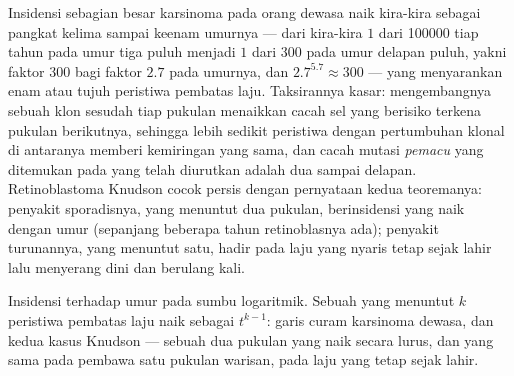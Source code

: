 \begin{example}\label{ex:b3:cancer-biology:exponent}
Insidensi sebagian besar karsinoma pada orang dewasa naik kira-kira sebagai
pangkat kelima sampai keenam umurnya --- dari kira-kira $1$ dari \num{100000}
tiap tahun pada umur tiga puluh menjadi $1$ dari $300$ pada umur delapan
puluh, yakni faktor $300$ bagi faktor $2.7$ pada umurnya, dan
$2.7^{5.7} \approx 300$ --- yang menyarankan enam atau tujuh peristiwa
pembatas laju. Taksirannya kasar: mengembangnya sebuah klon sesudah tiap
pukulan menaikkan cacah sel yang berisiko terkena pukulan berikutnya,
sehingga lebih sedikit peristiwa dengan pertumbuhan klonal di antaranya memberi
kemiringan yang sama, dan cacah mutasi \emph{pemacu} yang ditemukan pada 
yang telah diurutkan adalah dua sampai delapan. Retinoblastoma Knudson cocok
persis dengan pernyataan kedua teoremanya: penyakit sporadisnya, yang menuntut
dua pukulan, berinsidensi yang naik dengan umur (sepanjang beberapa tahun
retinoblasnya ada); penyakit turunannya, yang menuntut satu, hadir pada laju
yang nyaris tetap sejak lahir lalu menyerang dini dan berulang kali.
\end{example}

\begin{omfigure}

{\small Insidensi terhadap umur pada sumbu logaritmik. Sebuah  yang
menuntut $k$ peristiwa pembatas laju naik sebagai $t^{k-1}$: garis curam
karsinoma dewasa, dan kedua kasus Knudson --- sebuah  dua pukulan yang
naik secara lurus, dan  yang sama pada pembawa satu pukulan warisan,
pada laju yang tetap sejak lahir.}
\end{omfigure}

